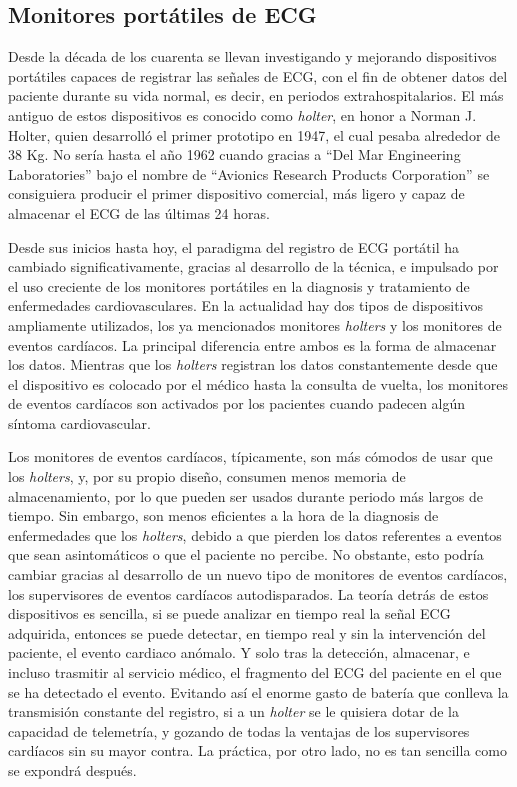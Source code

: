 \subsection{Monitores portátiles de ECG}

Desde la década de los cuarenta se llevan investigando y mejorando dispositivos portátiles capaces de registrar las señales de ECG, con el fin de obtener datos del paciente durante su vida normal, es decir, en periodos extrahospitalarios. El más antiguo de estos dispositivos es conocido como \textit{holter}, en honor a Norman J. Holter, quien desarrolló el primer prototipo en 1947, el cual pesaba alrededor de 38 Kg. No sería hasta el año 1962 cuando gracias a “Del Mar Engineering Laboratories” bajo el nombre de “Avionics Research Products Corporation” se consiguiera producir el primer dispositivo comercial, más ligero y capaz de almacenar el ECG de las últimas 24 horas. \cite{NormanHolter}

Desde sus inicios hasta hoy, el paradigma del registro de ECG portátil ha cambiado significativamente, gracias al desarrollo de la técnica, e impulsado por el uso creciente de los monitores portátiles en la diagnosis y tratamiento de enfermedades cardiovasculares. En la actualidad hay dos tipos de dispositivos ampliamente utilizados, los ya mencionados monitores \textit{holters} y los monitores de eventos cardíacos. La principal diferencia entre ambos es la forma de almacenar los datos. Mientras que los \textit{holters} registran los datos constantemente desde que el dispositivo es colocado por el médico hasta la consulta de vuelta, los monitores de eventos cardíacos son activados por los pacientes cuando padecen algún síntoma cardiovascular. \cite{AHA}

Los monitores de eventos cardíacos, típicamente, son más cómodos de usar que los \textit{holters}, y, por su propio diseño, consumen menos memoria de almacenamiento, por lo que pueden ser usados durante periodo más largos de tiempo. Sin embargo, son menos eficientes a la hora de la diagnosis de enfermedades que los \textit{holters}, debido a que pierden los datos referentes a eventos que sean asintomáticos o que el paciente no percibe. No obstante, esto podría cambiar gracias al desarrollo de un nuevo tipo de monitores de eventos cardíacos, los supervisores de eventos cardíacos autodisparados. La teoría detrás de estos dispositivos es sencilla, si se puede analizar en tiempo real la señal ECG adquirida, entonces se puede detectar, en tiempo real y sin la intervención del paciente, el evento cardiaco anómalo. Y solo tras la detección, almacenar, e incluso trasmitir al servicio médico, el fragmento del ECG del paciente en el que se ha detectado el evento. Evitando así el enorme gasto de batería que conlleva la transmisión constante del registro, si a un \textit{holter} se le quisiera dotar de la capacidad de telemetría, y gozando de todas la ventajas de los supervisores cardíacos sin su mayor contra. La práctica, por otro lado, no es tan sencilla como se expondrá después.


